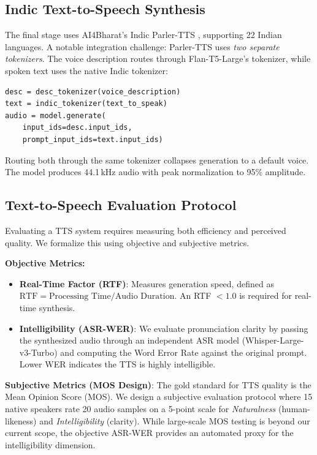 \documentclass[11pt]{article}
\begin{document}
\subsection{Indic Text-to-Speech Synthesis}\label{sec:tts}

The final stage uses AI4Bharat's Indic Parler-TTS \citep{ai4bharat_indic_parler}, supporting 22 Indian languages.  A notable integration challenge: Parler-TTS uses \emph{two separate tokenizers}.  The voice description routes through Flan-T5-Large's tokenizer, while spoken text uses the native Indic tokenizer:

\begin{lstlisting}
desc = desc_tokenizer(voice_description)
text = indic_tokenizer(text_to_speak)
audio = model.generate(
    input_ids=desc.input_ids,
    prompt_input_ids=text.input_ids)
\end{lstlisting}

Routing both through the same tokenizer collapses generation to a default voice.  The model produces 44.1\,kHz audio with peak normalization to 95\% amplitude.

\subsection{Text-to-Speech Evaluation Protocol}\label{sec:tts_eval}

Evaluating a TTS system requires measuring both efficiency and perceived quality. We formalize this using objective and subjective metrics.

\textbf{Objective Metrics:}
\begin{itemize}\itemsep0pt
    \item \textbf{Real-Time Factor (RTF)}: Measures generation speed, defined as $\text{RTF} = \text{Processing Time} / \text{Audio Duration}$. An RTF $<1.0$ is required for real-time synthesis.
    \item \textbf{Intelligibility (ASR-WER)}: We evaluate pronunciation clarity by passing the synthesized audio through an independent ASR model (Whisper-Large-v3-Turbo) and computing the Word Error Rate against the original prompt. Lower WER indicates the TTS is highly intelligible.
\end{itemize}

\textbf{Subjective Metrics (MOS Design)}:
The gold standard for TTS quality is the Mean Opinion Score (MOS). We design a subjective evaluation protocol where 15 native speakers rate 20 audio samples on a 5-point scale for \textit{Naturalness} (human-likeness) and \textit{Intelligibility} (clarity). While large-scale MOS testing is beyond our current scope, the objective ASR-WER provides an automated proxy for the intelligibility dimension.
\end{document}
